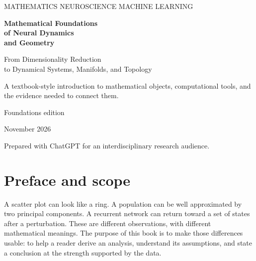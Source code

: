 \hypersetup{pageanchor=false}
\begin{titlepage}
\thispagestyle{empty}
\vspace*{1.1cm}
{\sffamily\color{teal}\large MATHEMATICS \quad NEUROSCIENCE \quad MACHINE LEARNING\par}
\vspace{1.1cm}
{\raggedright\sffamily\bfseries\color{navy}\fontsize{29}{35}\selectfont Mathematical Foundations\\of Neural Dynamics\\and Geometry\par}
\vspace{0.9cm}
{\raggedright\sffamily\color{navy}\Large From Dimensionality Reduction\\to Dynamical Systems, Manifolds, and Topology\par}
\vspace{1.1cm}
\noindent{\color{teal}\rule{\textwidth}{1.5pt}}
\vspace{0.6cm}
{\raggedright\large A textbook-style introduction to mathematical objects, computational tools, and the evidence needed to connect them.\par}
\vfill
{}
\vfill
{\sffamily\large Foundations edition\par}
{ November 2026\par}
\vspace{0.25cm}
{\small Prepared with ChatGPT for an interdisciplinary research audience.\par}
\end{titlepage}
\hypersetup{pageanchor=true}

\chapter*{Preface and scope}
A scatter plot can look like a ring. A population can be well approximated by two principal components. A recurrent network can return toward a set of states after a perturbation. These are different observations, with different mathematical meanings. The purpose of this book is to make those differences usable: to help a reader derive an analysis, understand its assumptions, and state a conclusion at the strength supported by the data.

